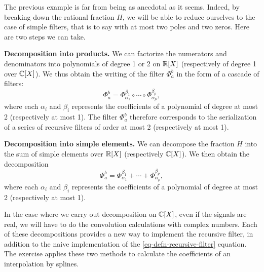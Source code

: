 The previous example is far from being as anecdotal as it seems. Indeed, by breaking down the rational fraction $ H $, we will be able to reduce ourselves to the case of simple filters, that is to say with at most two poles and two zeros. Here are two steps we can take. \begin{rs}
\item {}   \textbf{Decomposition into products.} We can factorize the numerators and denominators into polynomials of degree 1 or 2 on $ \mathbb{R} [ X] $ (respectively of degree 1 over $ \mathbb{C} [X] $). We thus obtain the writing of the filter $ \Phi_a^b $ in the form of a cascade of filters:
\begin{equation*}
\Phi_a^b = \Phi_{\alpha_1}^{\beta_1} \circ \cdots \circ \Phi_{\alpha_p}^{\beta_p},
\end{equation*}
where each $ \alpha_i $ and $ \beta_i $ represents the coefficients of a polynomial of degree at most 2 (respectively at most 1). The filter $ \Phi_a^b $ therefore corresponds to the serialization of a series of recursive filters of order at most 2 (respectively at most 1).
\item {}  \textbf{Decomposition into simple elements.} We can decompose the fraction $ H $ into the sum of simple elements over $ \mathbb{R} [X] $ (respectively $ \mathbb{C} [X] $). We then obtain the decomposition
\begin{equation*}
\Phi_a^b = \Phi_{\alpha_1}^{\beta_1} + \cdots + \Phi_{\alpha_p}^{\beta_p},
\end{equation*}
where each $ \alpha_i $ and $ \beta_i $ represents the coefficients of a polynomial of degree at most 2 (respectively at most 1).
\end{rs} In the case where we carry out decomposition on $ \mathbb{C} [X] $, even if the signals are real, we will have to do the convolution calculations with complex numbers. Each of these decompositions provides a new way to implement the recursive filter, in addition to the naive implementation of the \eqref{eq-defn-recursive-filter} equation. The  exercise applies these two methods to calculate the coefficients of an interpolation by splines.

